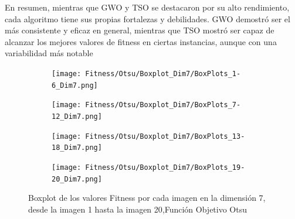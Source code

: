 \documentclass[conference]{IEEEtran}
\begin{document}
\noindent En resumen, mientras que GWO y TSO se destacaron por su alto rendimiento, cada algoritmo tiene sus propias fortalezas y debilidades. GWO demostró ser el más consistente y eficaz en general, mientras que TSO mostró ser capaz de alcanzar los mejores valores de fitness en ciertas instancias, aunque con una variabilidad más notable
\begin{figure}
	\centering
	
	\begin{subfigure}{0.4\textwidth}
		\texttt{[image: Fitness/Otsu/Boxplot\_Dim7/BoxPlots\_1-6\_Dim7.png]}
	\end{subfigure}
	
	\begin{subfigure}{0.4\textwidth}
		\texttt{[image: Fitness/Otsu/Boxplot\_Dim7/BoxPlots\_7-12\_Dim7.png]}
	\end{subfigure}
	\begin{subfigure}{0.4\textwidth}
		\texttt{[image: Fitness/Otsu/Boxplot\_Dim7/BoxPlots\_13-18\_Dim7.png]}
	\end{subfigure}
	\begin{subfigure}{0.4\textwidth}
		\texttt{[image: Fitness/Otsu/Boxplot\_Dim7/BoxPlots\_19-20\_Dim7.png]}
		\vspace{-120pt} %
	\end{subfigure}
	\caption{Boxplot de los valores Fitness por cada imagen en la dimensión 7, desde la imagen 1 hasta la imagen 20,Función Objetivo Otsu}
	\label{fig:imagenes}    
\end{figure}
\end{document}
